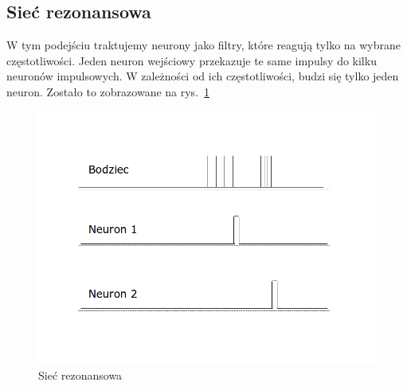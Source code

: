 \subsection{Sieć rezonansowa}
W tym podejściu traktujemy neurony jako filtry, które reagują tylko na wybrane częstotliwości. 
Jeden neuron wejściowy przekazuje te same impulsy do kilku neuronów impulsowych. 
W zależności od ich częstotliwości, budzi się tylko jeden neuron. Zostało to zobrazowane na rys.~\ref{fig:ResonantBurst}
	\begin{figure}[ht]
		\centering
		\includegraphics[width=\textwidth/2]{../ResonantBurst.png}
		\caption{Sieć rezonansowa}
                \label{fig:ResonantBurst}
	\end{figure}

